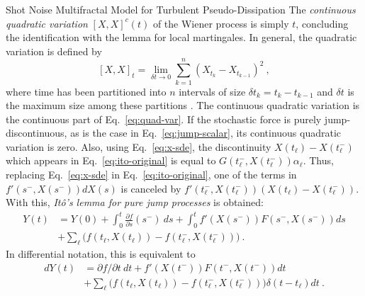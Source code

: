 \begin{chapter}{Shot Noise Multifractal Model for Turbulent Pseudo-Dissipation}
The \textit{continuous quadratic variation} $[X,X]^c(t)$ of the Wiener process is simply $t$, concluding the identification with the lemma for local martingales.
In general, the quadratic variation is defined by
\begin{equation} \label{eq:quad-var}
    [X,X]_{t}=\lim _{\delta t \rightarrow 0} \sum_{k=1}^{n}\left(X_{t_{k}}-X_{t_{k-1}}\right)^{2} \ ,
\end{equation}
where time has been partitioned into $n$ intervals of size $\delta t_k = t_k - t_{k-1}$ and $\delta t$ is the maximum size among these partitions \parencite{protter2005,klebaner2012}. The continuous quadratic variation is the continuous part of Eq.~\eqref{eq:quad-var}.
If the stochastic force is purely jump-discontinuous, as is the case in Eq.~\eqref{eq:jump-scalar}, its continuous quadratic variation is zero. Also, using Eq.~\eqref{eq:x-sde}, the discontinuity $X(t_{\ell}) - X(t_{\ell}^-)$ which appears in Eq.~\eqref{eq:ito-original} is equal to $G(t_{\ell}^-,X(t_{\ell}^-)) \alpha_{\ell}$.
Thus, replacing Eq.~\eqref{eq:x-sde} in Eq.~\eqref{eq:ito-original}, one of the terms in $f'(s^-,X(s^-)) dX(s)$ is canceled by $f'(t_{\ell}^-,X(t_{\ell}^-)) (X(t_{\ell}) - X(t_{\ell}^-))$. With this, \textit{It\^{o}'s lemma for pure jump processes} is obtained:
\begin{equation} \label{eq:ito-semi}
\begin{split}
    Y(t) &= Y(0) +
    \int_0^t \frac{\partial f}{\partial s}(s^-) \ ds
    + \int_0^t f'(X(s^-)) F(s^-,X(s^-)) ds \\
    &+ \sum_{\ell} \Big( f(t_{\ell},X(t_{\ell})) - f(t_{\ell}^-,X(t_{\ell}^-)) \Big) \ .
    \end{split}
\end{equation}
In differential notation, this is equivalent to
\begin{equation} \label{eq:ito-jump}
\begin{split}
    d Y(t) &=
    \partial f / \partial t \ dt +
    f'(X(t^-)) F(t^-,X(t^-)) dt \\
    &+ \sum_{\ell} \Big( f(t_{\ell},X(t_{\ell})) - f(t_{\ell}^-,X(t_{\ell}^-)) \Big)
    \delta(t-t_{\ell}) dt \ .
    \end{split}
\end{equation}


\end{chapter}
